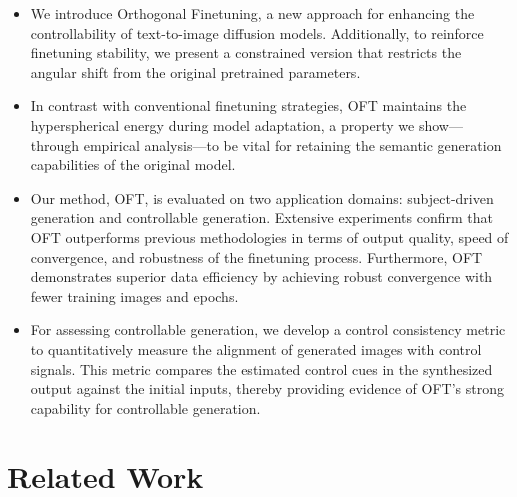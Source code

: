 \begin{itemize}[leftmargin=*,nosep]

    \item We introduce Orthogonal Finetuning, a new approach for enhancing the controllability of text-to-image diffusion models. Additionally, to reinforce finetuning stability, we present a constrained version that restricts the angular shift from the original pretrained parameters.
    \item In contrast with conventional finetuning strategies, OFT maintains the hyperspherical energy during model adaptation, a property we show—through empirical analysis—to be vital for retaining the semantic generation capabilities of the original model.
    \item Our method, OFT, is evaluated on two application domains: subject-driven generation and controllable generation. Extensive experiments confirm that OFT outperforms previous methodologies in terms of output quality, speed of convergence, and robustness of the finetuning process. Furthermore, OFT demonstrates superior data efficiency by achieving robust convergence with fewer training images and epochs.
    \item For assessing controllable generation, we develop a control consistency metric to quantitatively measure the alignment of generated images with control signals. This metric compares the estimated control cues in the synthesized output against the initial inputs, thereby providing evidence of OFT's strong capability for controllable generation.
\end{itemize}

\section{Related Work}

